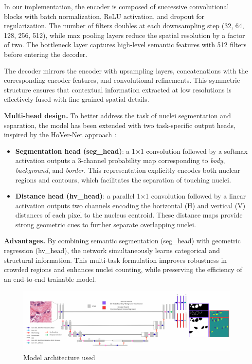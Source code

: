 \documentclass[target=bach,aauheader=,style=]{thud}
\begin{document}
In our implementation, the encoder is composed of successive convolutional blocks with batch normalization, ReLU activation, and dropout for regularization. 
The number of filters doubles at each downsampling step (32, 64, 128, 256, 512), while max pooling layers reduce the spatial resolution by a factor of two. 
The bottleneck layer captures high-level semantic features with 512 filters before entering the decoder.

The decoder mirrors the encoder with upsampling layers, concatenations with the corresponding encoder features, and convolutional refinements. 
This symmetric structure ensures that contextual information extracted at low resolutions is effectively fused with fine-grained spatial details.

\noindent\textbf{Multi-head design.}  
To better address the task of nuclei segmentation and separation, the model has been extended with two task-specific output heads, inspired by the HoVer-Net approach \cite{graham2019hovernet}:  
\begin{itemize}
    \item \textbf{Segmentation head (seg\_head)}: a 1$\times$1 convolution followed by a softmax activation outputs a 3-channel probability map corresponding to \textit{body}, \textit{background}, and \textit{border}. This representation explicitly encodes both nuclear regions and contours, which facilitates the separation of touching nuclei.  
    \item \textbf{Distance head (hv\_head)}: a parallel 1$\times$1 convolution followed by a linear activation outputs two channels encoding the horizontal (H) and vertical (V) distances of each pixel to the nucleus centroid. These distance maps provide strong geometric cues to further separate overlapping nuclei.  
\end{itemize}

\noindent\textbf{Advantages.}  
By combining semantic segmentation (seg\_head) with geometric regression (hv\_head), the network simultaneously learns categorical and structural information. 
This multi-task formulation improves robustness in crowded regions and enhances nuclei counting, while preserving the efficiency of an end-to-end trainable model.
\begin{figure}[H] %
    \centering
    \includegraphics[width=1\textwidth]{imgs/model.jpg}
    \caption{Model architecture used}
    \label{fig:Unet}
\end{figure}
\end{document}
